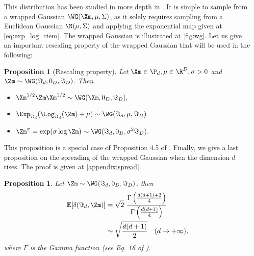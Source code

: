 \documentclass[10pt]{article} %
\theoremstyle{plain}
\newtheorem{proposition}[theorem]{Proposition}
\theoremstyle{definition}
\theoremstyle{remark}
\newtheorem{remark}[theorem]{Remark}
\begin{document}
This distribution has been studied in more depth in \cite{desurrel2025wrappedgaussianmanifoldsymmetric}. It is simple to sample from a wrapped Gaussian $\WG(\Xm, \mu, \Sigma)$, as it solely requires sampling from a Euclidean Gaussian $\N(\mu, \Sigma)$ and applying the exponential map given at \cref{eq:exp_log_riem}. The wrapped Gaussian is illustrated at \cref{fig:wg}.
Let us give an important rescaling property of the wrapped Gaussian that will be used in the following:
\begin{proposition}[Rescaling property]
  Let $\Xm \in \P_d, \mu \in \R^D, \sigma > 0$ and $\Zm \sim \WG(\Im_d,0_D, \Im_D)$. Then
  \begin{itemize}
    \item $\Xm^{1/2} \Zm \Xm^{1/2} \sim  \WG(\Xm,0_D, \Im_D),$
    \item $\Exp_{\Im_d}(\Log_{\Im_d}(\Zm) + \mu) \sim \WG(\Im_d,\mu,\Im_D)$
    \item $\Zm^{\sigma} = \exp(\sigma \log \Zm) \sim \WG(\Im_d, 0_D,\sigma^2\Im_D).$
  \end{itemize}
  \label{prop:rescaling_prop}
\end{proposition}
This proposition is a special case of Proposition 4.5 of \citet{desurrel2025wrappedgaussianmanifoldsymmetric}.
Finally, we give a last proposition on the spreading of the wrapped Gaussian when the dimension $d$ rises. The proof is given at \cref{appendix:spread}.
\begin{proposition}
  \label{prop:spread}
  Let $\Zm \sim \WG(\Im_d, 0_D, \Im_D)$, then
  \begin{equation*}
    \begin{aligned}
      \mathbb{E}[\delta(\Im_d, \Zm)] &= \sqrt{2}~\frac{\Gamma\left(\frac{d(d+1)+2}{4}\right)}{\Gamma\left(\frac{d(d+1)}{4}\right)} \\
      &\sim \sqrt{\frac{d(d+1)}{2}} \quad (d \rightarrow +\infty),
    \end{aligned}
  \end{equation*}
  where $\Gamma$ is the Gamma function (see Eq. 16 of \citealt{euler}).
\end{proposition}
\end{document}
